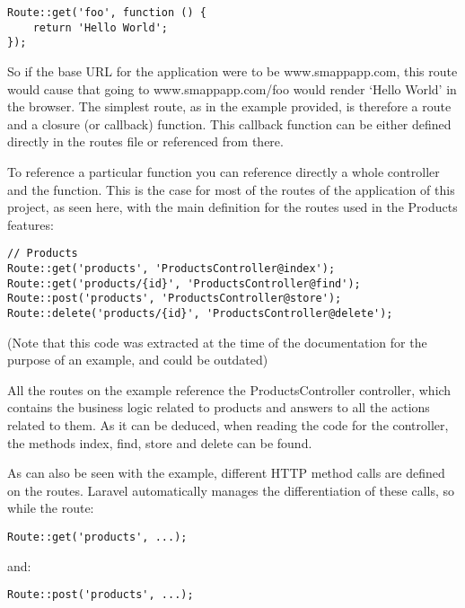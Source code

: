 \begin{verbatim}
Route::get('foo', function () {
    return 'Hello World';
});
\end{verbatim}

So if the base URL for the application were to be www.smappapp.com, this route would cause that going to www.smappapp.com/foo would render ‘Hello World’ in the browser. The simplest route, as in the example provided, is therefore a route and a closure (or callback) function. This callback function can be either defined directly in the routes file or referenced from there.

To reference a particular function you can reference directly a whole controller and the function. This is the case for most of the routes of the application of this project, as seen here, with the main definition for the routes used in the Products features:

\begin{verbatim}
// Products
Route::get('products', 'ProductsController@index');
Route::get('products/{id}', 'ProductsController@find');
Route::post('products', 'ProductsController@store');
Route::delete('products/{id}', 'ProductsController@delete');
\end{verbatim}

(Note that this code was extracted at the time of the documentation for the purpose of an example, and could be outdated)

All the routes on the example reference the ProductsController controller, which contains the business logic related to products and answers to all the actions related to them. As it can be deduced, when reading the code for the controller, the methods index, find, store and delete can be found.

As can also be seen with the example, different HTTP method calls are defined on the routes. Laravel automatically manages the differentiation of these calls, so while the route:

\begin{verbatim}
Route::get('products', ...);
\end{verbatim}

and:

\begin{verbatim}
Route::post('products', ...);
\end{verbatim}

